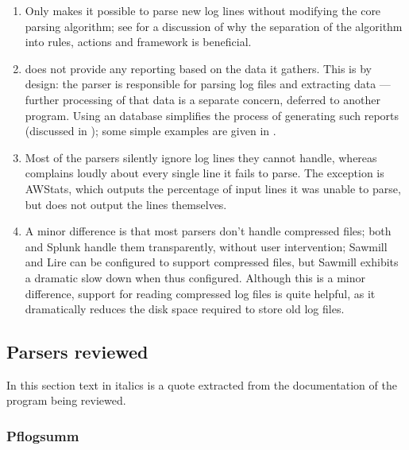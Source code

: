 \begin{enumerate}

    \item Only \parsername{} makes it possible to parse new log lines
        without modifying the core parsing algorithm; see  for a discussion of why the
        separation of the algorithm into rules, actions and framework is
        beneficial.

    \item \parsername{} does not provide any reporting based on the data it
        gathers.  This is by design: the parser is responsible for parsing
        log files and extracting data --- further processing of that data
        is a separate concern, deferred to another program.  Using an
        \SQL{} database simplifies the process of generating such reports
        (discussed in ); some simple examples
        are given in .

    \item Most of the parsers silently ignore log lines they cannot handle,
        whereas \parsername{} complains loudly about every single line it
        fails to parse.  The exception is AWStats, which outputs the
        percentage of input lines it was unable to parse, but does not
        output the lines themselves.

    \item A minor difference is that most parsers don't handle compressed
        files; both \parsername{} and Splunk handle them transparently,
        without user intervention; Sawmill and Lire can be configured to
        support compressed files, but Sawmill exhibits a dramatic slow down
        when thus configured.  Although this is a minor difference, support
        for reading compressed log files is quite helpful, as it
        dramatically reduces the disk space required to store old log
        files.

\end{enumerate}

\subsection{Parsers reviewed}

In this section text in italics is a quote extracted from the documentation
of the program being reviewed.


\subsubsection{Pflogsumm}

